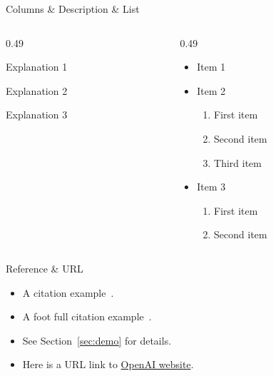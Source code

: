 \documentclass[compress,aspectratio=169]{beamer}
\begin{document}
\begin{frame}{Columns \& Description \& List}

    \begin{columns}

        \begin{column}{0.49\textwidth}
            \begin{description}[leftmargin=1cm]
                \item[Description 1] Explanation 1
                \item[Description 2] Explanation 2
                \item[Description 3] Explanation 3
            \end{description}
        \end{column}

        \hfill

        \begin{column}{0.49\textwidth}
            \begin{itemize}
                \item Item 1
                \item Item 2
                      \begin{enumerate}
                          \item First item
                          \item Second item
                          \item Third item
                      \end{enumerate}
                \item Item 3
                      \begin{enumerate}
                          \item First item
                          \item Second item
                      \end{enumerate}
            \end{itemize}
        \end{column}
    \end{columns}

\end{frame}

\begin{frame}{Reference \& URL}
    \begin{itemize}
        \item A citation example~\cite{vaswaniAttentionAllYou2023}.

        \item A foot full citation example~.

        \item See Section~\ref{sec:demo} for details.

        \item Here is a URL link to \href{https://www.openai.com}{OpenAI website}.
    \end{itemize}
\end{frame}
\end{document}
